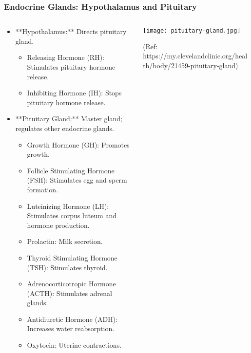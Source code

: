 \begin{frame}[fragile]\frametitle{Endocrine Glands: Hypothalamus and Pituitary}
\begin{columns}
    \begin{column}[T]{0.5\linewidth}
      \begin{itemize}
		\item **Hypothalamus:** Directs pituitary gland.
		  \begin{itemize}
		    \item Releasing Hormone (RH): Stimulates pituitary hormone release.
		    \item Inhibiting Hormone (IH): Stops pituitary hormone release.
		  \end{itemize}
		\item **Pituitary Gland:** Master gland; regulates other endocrine glands.
		  \begin{itemize}
		    \item Growth Hormone (GH): Promotes growth.
		    \item Follicle Stimulating Hormone (FSH): Stimulates egg and sperm formation.
		    \item Luteinizing Hormone (LH): Stimulates corpus luteum and hormone production.
		    \item Prolactin: Milk secretion.
		    \item Thyroid Stimulating Hormone (TSH): Stimulates thyroid.
		    \item Adrenocorticotropic Hormone (ACTH): Stimulates adrenal glands.
		    \item Antidiuretic Hormone (ADH): Increases water reabsorption.
		    \item Oxytocin: Uterine contractions.
		  \end{itemize}
	  \end{itemize}
    \end{column}
    \begin{column}[T]{0.5\linewidth}
		\begin{center}
		\texttt{[image: pituitary-gland.jpg]}
		
		{\tiny (Ref: https://my.clevelandclinic.org/health/body/21459-pituitary-gland)}
		\end{center}	
    \end{column}
  \end{columns}
\end{frame}



